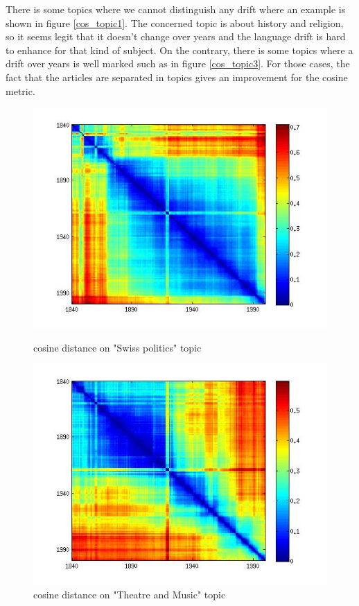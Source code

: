 There is some topics where we cannot distinguish any drift where an example is shown in figure \ref{cos_topic1}. The concerned topic is about history and religion, so it seems legit that it doesn't change over years and the language drift is hard to enhance for that kind of subject. On the contrary, there is some topics where a drift over years is well marked such as in figure \ref{cos_topic3}. For those cases, the fact that the articles are separated in topics gives an improvement for the cosine metric.

\begin{figure}[H]
    \begin{minipage}[b]{0.48\linewidth}
        \includegraphics[scale=0.3]{Pictures/topics/cos/topic7.jpg}
        \caption{cosine distance on "Swiss politics" topic}
        \label{cos_topic7}
    \end{minipage}\hfill
    \begin{minipage}[b]{0.5\linewidth}
        \includegraphics[scale=0.3]{Pictures/topics/cos/topic9.jpg}
        \caption{cosine distance on "Theatre and Music" topic}
        \label{cos_topic9}
    \end{minipage}\hfill
\end{figure}

